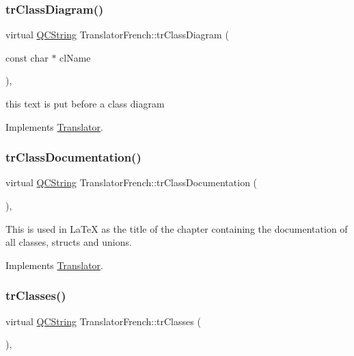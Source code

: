 \subsubsection{\texorpdfstring{trClassDiagram()}{trClassDiagram()}}
{\footnotesize\ttfamily virtual \mbox{\hyperlink{class_q_c_string}{Q\+C\+String}} Translator\+French\+::tr\+Class\+Diagram (\begin{DoxyParamCaption}\item[{const char $\ast$}]{cl\+Name }\end{DoxyParamCaption})\hspace{0.3cm}{\ttfamily [inline]}, {\ttfamily [virtual]}}

this text is put before a class diagram 

Implements \mbox{\hyperlink{class_translator}{Translator}}.

\mbox{\label{class_translator_french_a0c9081453f1de2081144337336923a52}} 
\subsubsection{\texorpdfstring{trClassDocumentation()}{trClassDocumentation()}}
{\footnotesize\ttfamily virtual \mbox{\hyperlink{class_q_c_string}{Q\+C\+String}} Translator\+French\+::tr\+Class\+Documentation (\begin{DoxyParamCaption}{ }\end{DoxyParamCaption})\hspace{0.3cm}{\ttfamily [inline]}, {\ttfamily [virtual]}}

This is used in La\+TeX as the title of the chapter containing the documentation of all classes, structs and unions. 

Implements \mbox{\hyperlink{class_translator}{Translator}}.

\mbox{\label{class_translator_french_a119e41eded23030af9d0a13e6f6a346c}} 
\subsubsection{\texorpdfstring{trClasses()}{trClasses()}}
{\footnotesize\ttfamily virtual \mbox{\hyperlink{class_q_c_string}{Q\+C\+String}} Translator\+French\+::tr\+Classes (\begin{DoxyParamCaption}{ }\end{DoxyParamCaption})\hspace{0.3cm}{\ttfamily [inline]}, {\ttfamily [virtual]}}

